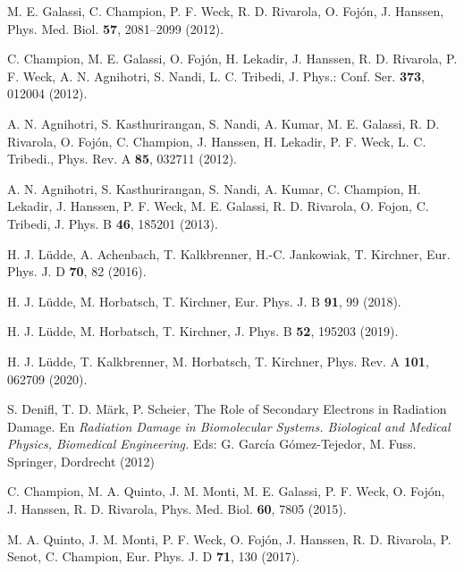\begin{thebibliography}{9}
M. E. Galassi, C. Champion, P. F. Weck, R. D. Rivarola, O. Fojón, J. Hanssen,
Phys. Med. Biol. \textbf{57}, 2081--2099 (2012).

C. Champion, M. E. Galassi, O. Foj\'{o}n, H. Lekadir, J. Hanssen, 
R. D. Rivarola, P. F. Weck, A. N. Agnihotri, S. Nandi, L. C. Tribedi,
J. Phys.: Conf. Ser. \textbf{373}, 012004 (2012).

A. N. Agnihotri, S. Kasthurirangan, S. Nandi, A.
Kumar, M. E. Galassi, R. D. Rivarola, O. Foj\'{o}n, C. Champion, J. Hanssen,
H. Lekadir, P. F. Weck, L. C. Tribedi.,
Phys. Rev. A \textbf{85}, 032711 (2012).

A. N. Agnihotri, S. Kasthurirangan, S. Nandi, A. Kumar, C. Champion, 
H. Lekadir, J. Hanssen, P. F. Weck, M. E. Galassi, R. D. Rivarola, 
O. Fojon, C. Tribedi, 
J. Phys. B \textbf{46}, 185201 (2013).

H. J. L\"udde, A. Achenbach, T. Kalkbrenner, H.-C. Jankowiak, T. Kirchner,
Eur. Phys. J. D \textbf{70}, 82 (2016).

H. J. L\"udde, M. Horbatsch, T. Kirchner,
Eur. Phys. J. B \textbf{91}, 99 (2018).

H. J. L\"udde, M. Horbatsch, T. Kirchner,
J. Phys. B \textbf{52}, 195203 (2019).

H. J. L\"udde, T. Kalkbrenner, M. Horbatsch, T. Kirchner,
Phys. Rev. A \textbf{101}, 062709 (2020).

S. Denifl, T. D. M\"ark, P. Scheier,
The Role of Secondary Electrons in Radiation Damage. En \textit{Radiation 
Damage in Biomolecular Systems. Biological and Medical Physics, 
Biomedical Engineering.} Eds: G. García Gómez-Tejedor, M. Fuss. 
Springer, Dordrecht (2012) 

C. Champion, M. A. Quinto, J. M. Monti, M. E. Galassi, P. F. Weck, 
O. Fojón, J. Hanssen, R. D. Rivarola, 
Phys. Med. Biol. \textbf{60}, 7805 (2015).

M. A. Quinto, J. M. Monti, P. F. Weck, O. Fojón, J. Hanssen, R. D. Rivarola, 
P. Senot, C. Champion,
Eur. Phys. J. D \textbf{71}, 130 (2017). 


\end{thebibliography}
